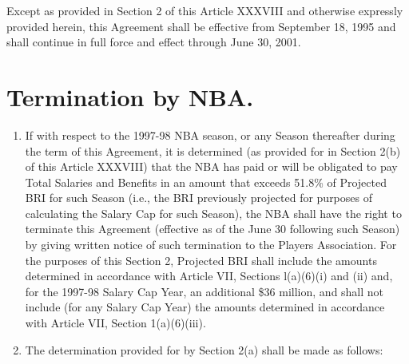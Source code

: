 \documentclass[
]{book}
\providecommand{\tightlist}{%
  \setlength{\itemsep}{0pt}\setlength{\parskip}{0pt}}
\begin{document}
Except as provided in Section 2 of this Article XXXVIII and otherwise expressly provided herein, this Agreement shall be effective from September 18, 1995 and shall continue in full force and effect through June 30, 2001.

\hypertarget{termination-by-nba.}{%
\section{Termination by NBA.}\label{termination-by-nba.}}

\begin{enumerate}
\def\labelenumi{(\alph{enumi})}
\tightlist
\item
  If with respect to the 1997-98 NBA season, or any Season thereafter during the term of this Agreement, it is determined (as provided for in Section 2(b) of this Article XXXVIII) that the NBA has paid or will be obligated to pay Total Salaries and Benefits in an amount that exceeds 51.8\% of Projected BRI for such Season (i.e., the BRI previously projected for purposes of calculating the Salary Cap for such Season), the NBA shall have the right to terminate this Agreement (effective as of the June 30 following such Season) by giving written notice of such termination to the Players Association. For the purposes of this Section 2, Projected BRI shall include the amounts determined in accordance with Article VII, Sections l(a)(6)(i) and (ii) and, for the 1997-98 Salary Cap Year, an additional \$36 million, and shall not include (for any Salary Cap Year) the amounts determined in accordance with Article VII, Section 1(a)(6)(iii).
\item
  The determination provided for by Section 2(a) shall be made as follows:


\end{enumerate}
\end{document}
